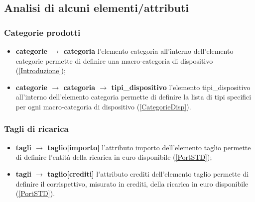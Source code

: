 \documentclass[a4paper, 14pt]{article}
\begin{document}
\begin{flushleft}
		\subsection{Analisi di alcuni elementi/attributi} \hypersetup{linkcolor=blue}
			\subsubsection{Categorie prodotti}
				\begin{itemize}
					\item \textbf{categorie $\rightarrow$ categoria} l'elemento categoria all'interno dell'elemento categorie permette di definire una macro-categoria di dispositivo (\ref{Introduzione});
					\item \textbf{categorie $\rightarrow$ categoria $\rightarrow$ tipi\_dispositivo } l'elemento tipi\_dispositivo all'interno dell'elemento categoria permette di definire la lista di tipi specifici per ogni macro-categoria di dispositivo (\ref{CategorieDisp}).
				\end{itemize}
			\smallskip
			\subsubsection{Tagli di ricarica} 
				\begin{itemize}
					\item \textbf{tagli $\rightarrow$ taglio[importo] } l'attributo importo dell'elemento taglio 
					permette di definire l'entità della ricarica in euro disponibile (\ref{PortSTD});
					\item \textbf{tagli $\rightarrow$ taglio[crediti] } l'attributo crediti dell'elemento taglio 
					permette di definire il corrispettivo, misurato in crediti, della ricarica in euro disponibile (\ref{PortSTD}).
				\end{itemize}
			\smallskip

\end{flushleft}
\end{document}

